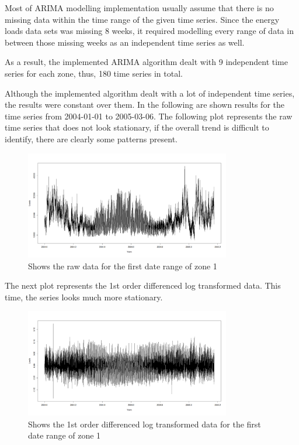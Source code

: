 \documentclass{article} %
\begin{document}
Most of ARIMA modelling implementation usually assume that there is no missing data within the time range of the given time series. Since the energy loads data sets was missing 8 weeks, it required modelling every range of data in between those missing weeks as an independent time series as well.

As a result, the implemented ARIMA algorithm dealt with 9 independent time series for each zone, thus, 180 time series in total.

Although the implemented algorithm dealt with a lot of independent time series, the results were constant over them. In the following are shown results for the time series from 2004-01-01 to 2005-03-06.
The following plot represents the raw time series that does not look stationary, if the overall trend is difficult to identify, there are clearly some patterns present.

\begin{figure}[H]
  \centering
    \includegraphics[width=0.80\textwidth]{loadsRawData}
  \caption{Shows the raw data for the first date range of zone 1 }
\end{figure}

The next plot represents the 1st order differenced log transformed data. This time, the series looks much more stationary. 

\begin{figure}[H]
  \centering
    \includegraphics[width=0.80\textwidth]{LoadsStationary}
  \caption{Shows the 1st order differenced log transformed data for the first date range of zone 1 }
\end{figure}
\end{document}
